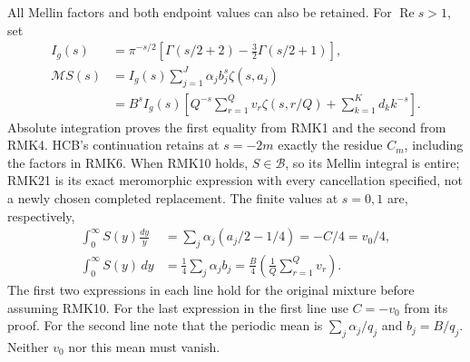 \documentclass[11pt]{article}
\begin{document}
All Mellin factors and both endpoint values can also be retained.
For $\operatorname{Re}s>1$, set
\begin{equation}\tag{RMK21}
\begin{split}
 I_g(s)&=\pi^{-s/2}
       [\Gamma(s/2+2)-\tfrac32\Gamma(s/2+1)],\\
 \mathcal M S(s)
 &=I_g(s)\sum_{j=1}^J\alpha_j b_j^s\zeta(s,a_j)\\
 &=B^sI_g(s)\left[
       Q^{-s}\sum_{r=1}^Qv_r\zeta(s,r/Q)
       +\sum_{k=1}^K d_k k^{-s}\right].
\end{split}
\end{equation}
Absolute integration proves the first equality from RMK1 and the
second from RMK4. HCB's continuation retains at $s=-2m$ exactly
the residue $C_m$, including the factors in RMK6. When RMK10
holds, $S\in\mathcal B$, so its Mellin integral is entire; RMK21
is its exact meromorphic expression with every cancellation
specified, not a newly chosen completed replacement. The finite
values at $s=0,1$ are, respectively,
\begin{equation}\tag{RMK22}
\begin{split}
 \int_0^\infty S(y)\frac{dy}{y}
    &=\sum_j\alpha_j(a_j/2-1/4)=-C/4=v_0/4,\\
 \int_0^\infty S(y)\,dy
    &=\tfrac14\sum_j\alpha_jb_j
      =\frac B4\left(\frac1Q\sum_{r=1}^Qv_r\right).
\end{split}
\end{equation}
The first two expressions in each line hold for the original
mixture before assuming RMK10. For the last expression in the
first line use $C=-v_0$ from its proof. For the second line note
that the periodic mean is $\sum_j\alpha_j/q_j$ and
$b_j=B/q_j$. Neither $v_0$ nor this mean must vanish.
\end{document}
